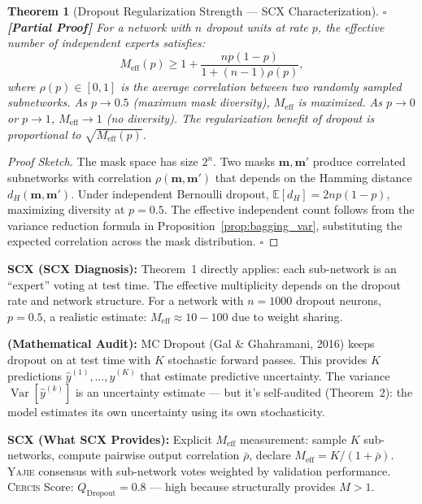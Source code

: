 \documentclass[12pt,a4paper]{article}
\newtheorem{theorem}{Theorem}[section]
\theoremstyle{definition}
\newcommand{\rigorPartial}{{\color{rigorcolor}$\square$\,\textbf{[Partial Proof]}}}
\newcommand{\Yajie}{\textsc{Yajie}}
\newcommand{\Cercis}{\textsc{Cercis}}
\DeclareMathOperator{\Var}{Var}
\newcommand{\E}{\mathbb{E}}
\newcommand{\whatMissing}{\noindent\textbf{SCX (What SCX Provides):} }
\newcommand{\diagnosis}{\noindent\textbf{SCX (SCX Diagnosis):} }
\newcommand{\mathAudit}{\noindent\textbf{ (Mathematical Audit):} }
\begin{document}
\begin{theorem}[Dropout Regularization Strength — SCX Characterization]\label{thm:dropout_bound}
\rigorPartial
For a network with $n$ dropout units at rate $p$, the effective number of independent experts satisfies:
\begin{equation}\label{eq:dropout_Meff}
    M_{\text{eff}}(p) \ge 1 + \frac{n p (1-p)}{1 + (n-1)\rho(p)},
\end{equation}
where $\rho(p) \in [0,1]$ is the average correlation between two randomly sampled subnetworks. As $p \to 0.5$ (maximum mask diversity), $M_{\text{eff}}$ is maximized. As $p \to 0$ or $p \to 1$, $M_{\text{eff}} \to 1$ (no diversity). The regularization benefit of dropout is proportional to $\sqrt{M_{\text{eff}}(p)}$.
\end{theorem}

\begin{proof}[Proof Sketch]
The mask space has size $2^n$. Two masks $\mathbf{m}, \mathbf{m}'$ produce correlated subnetworks with correlation $\rho(\mathbf{m}, \mathbf{m}')$ that depends on the Hamming distance $d_H(\mathbf{m}, \mathbf{m}')$. Under independent Bernoulli dropout, $\E[d_H] = 2np(1-p)$, maximizing diversity at $p=0.5$. The effective independent count follows from the variance reduction formula in Proposition~\ref{prop:bagging_var}, substituting the expected correlation across the mask distribution. \hfill $\square$
\end{proof}

\diagnosis{} Theorem~1 directly applies: each sub-network is an ``expert'' voting at test time. The effective multiplicity depends on the dropout rate and network structure. For a network with $n=1000$ dropout neurons, $p=0.5$, a realistic estimate: $M_{\text{eff}} \approx 10-100$ due to weight sharing.

\mathAudit{} MC Dropout (Gal \& Ghahramani, 2016) keeps dropout on at test time with $K$ stochastic forward passes. This provides $K$ predictions $\hat{y}^{(1)}, \ldots, \hat{y}^{(K)}$ that estimate predictive uncertainty. The variance $\Var[\hat{y}^{(k)}]$ is an uncertainty estimate — but it's self-audited (Theorem~2): the model estimates its own uncertainty using its own stochasticity.

\whatMissing{} Explicit $M_{\text{eff}}$ measurement: sample $K$ sub-networks, compute pairwise output correlation $\bar{\rho}$, declare $M_{\text{eff}} = K/(1+\bar{\rho})$. \Yajie{} consensus with sub-network votes weighted by validation performance. \Cercis{} Score: $Q_{\text{Dropout}} = 0.8$ — high because structurally provides $M>1$.
\end{document}
